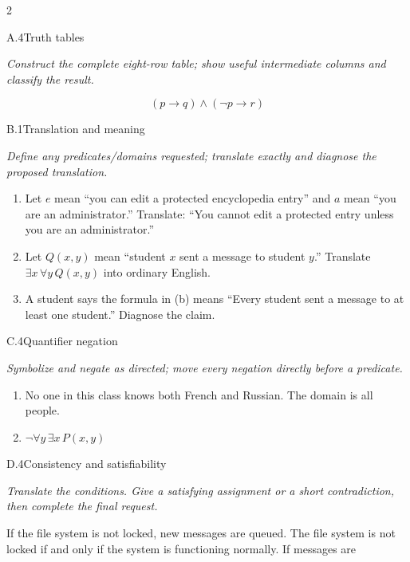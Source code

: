 \documentclass[9pt]{extarticle}
\begin{document}
\CoreWorkArea
\FormBreak
{}
\begin{multicols}{2}
\begin{CoreProblem}{A.4}{Truth tables}
{\scriptsize\textit{Construct the complete eight-row table; show useful intermediate columns and classify the result.}\par}
\[
  (p\to q)\land(\neg p\to r)
\]
\end{CoreProblem}
\begin{CoreProblem}{B.1}{Translation and meaning}
{\scriptsize\textit{Define any predicates/domains requested; translate exactly and diagnose the proposed translation.}\par}
\begin{enumerate}[label=(\alph*)]
  \item Let $e$ mean ``you can edit a protected encyclopedia entry'' and $a$
        mean ``you are an administrator.'' Translate: ``You cannot edit a
        protected entry unless you are an administrator.''
  \item Let $Q(x,y)$ mean ``student $x$ sent a message to student $y$.''
        Translate $\exists x\,\forall y\,Q(x,y)$ into ordinary English.
  \item A student says the formula in (b) means ``Every student sent a message
        to at least one student.'' Diagnose the claim.
\end{enumerate}
\end{CoreProblem}
\begin{CoreProblem}{C.4}{Quantifier negation}
{\scriptsize\textit{Symbolize and negate as directed; move every negation directly before a predicate.}\par}
\begin{enumerate}[label=(\alph*)]
  \item No one in this class knows both French and Russian. The domain is all
        people.
  \item $\neg\forall y\,\exists x\,P(x,y)$
\end{enumerate}
\end{CoreProblem}
\columnbreak
\begin{CoreProblem}{D.4}{Consistency and satisfiability}
{\scriptsize\textit{Translate the conditions. Give a satisfying assignment or a short contradiction, then complete the final request.}\par}
If the file system is not locked, new messages are queued. The file system is
not locked if and only if the system is functioning normally. If messages are

\end{CoreProblem}
\end{multicols}
\end{document}
